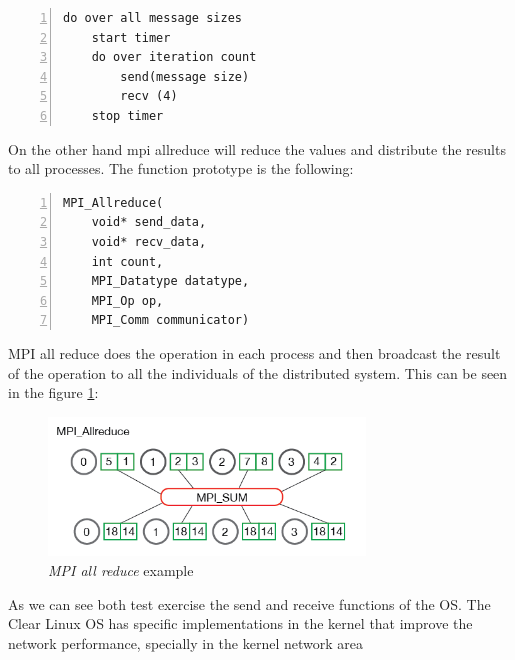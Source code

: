 \begin{minipage}{\textwidth}
\end{minipage}

\begin{minipage}{\textwidth}
\begin{lstlisting}[frame=single,numbers=left]
do over all message sizes 
    start timer
    do over iteration count 
        send(message size) 
        recv (4)
    stop timer
\end{lstlisting}
\end{minipage}

On the other hand mpi allreduce will reduce the values and distribute the
results to all processes. The function prototype is the following:


\begin{minipage}{\textwidth}
\end{minipage}

\begin{minipage}{\textwidth}
\begin{lstlisting}[frame=single,numbers=left]
MPI_Allreduce(
    void* send_data,
    void* recv_data,
    int count,
    MPI_Datatype datatype,
    MPI_Op op,
    MPI_Comm communicator)
\end{lstlisting}
\end{minipage}

MPI all reduce does the operation in each process and then broadcast the result
of the operation to all the individuals of the distributed system. This can be
seen in the figure \ref{mpi_allreduce_example}: 

\begin{figure}[H]
\centering
\includegraphics[width=0.75\textwidth]{images/mpi_allreduce_1.png}
\caption{\textit{MPI all reduce} example }
\label{mpi_allreduce_example}
\end{figure}

As we can see both test exercise the send and receive functions of the OS. The
Clear Linux OS has specific implementations in the kernel that improve the
network performance, specially in the kernel network area

